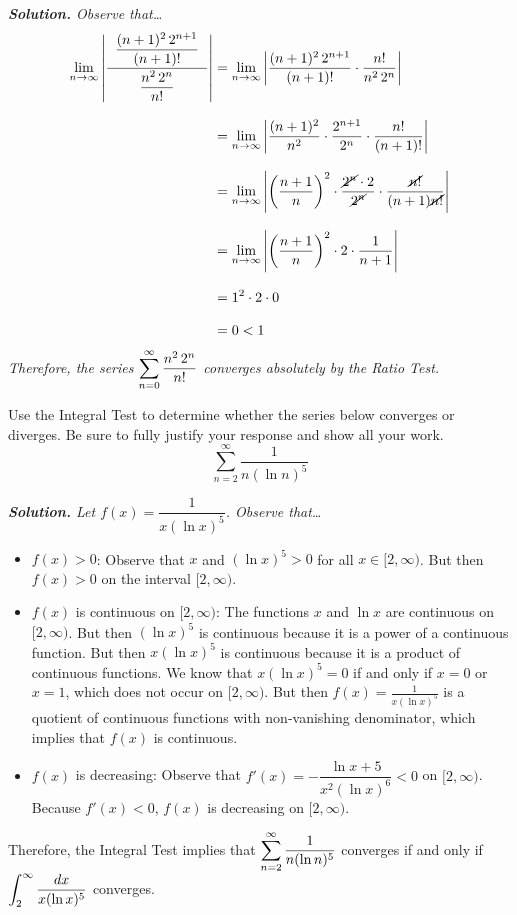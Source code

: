 \documentclass[12pt,letterpaper]{exam}
\begin{document}
\begin{questions}
{\itshape \textbf{Solution.} Observe that\dots
	\[
	\begin{aligned}
	\lim_{n \to \infty} \left| \dfrac{\;\;\dfrac{(n + 1)^2 \, 2^{n + 1}}{(n + 1)!}\;\;}{\dfrac{n^2 \, 2^n}{n!}} \right|&= \lim_{n \to \infty} \left| \dfrac{(n + 1)^2 \, 2^{n + 1}}{(n + 1)!} \cdot \dfrac{n!}{n^2 \,2^n} \right| \\[0.3cm]
	&= \lim_{n \to \infty} \left| \dfrac{(n + 1)^2}{n^2} \cdot \dfrac{2^{n + 1}}{2^n} \cdot \dfrac{n!}{(n + 1)!} \right| \\[0.3cm]
	&= \lim_{n \to \infty} \left| \left( \dfrac{n + 1}{n} \right)^2 \cdot \dfrac{\cancel{2^n} \cdot 2}{\cancel{2^n}} \cdot \dfrac{\cancel{n!}}{(n + 1) \cancel{n!}} \right| \\[0.3cm]
	&= \lim_{n \to \infty} \left| \left( \dfrac{n + 1}{n} \right)^2 \cdot 2 \cdot \dfrac{1}{n + 1} \right| \\[0.3cm]
	&= 1^2 \cdot 2 \cdot 0 \\[0.3cm]
	&= 0 < 1
	\end{aligned}
	\]
Therefore, the series $\displaystyle\sum_{n=0}^\infty \dfrac{n^2 \, 2^n}{n!}$ converges absolutely by the Ratio Test.}



\newpage
\question[15] Use the Integral Test to determine whether the series below converges or diverges. Be sure to fully justify your response and show all your work. 
	\[
	\sum_{n=2}^\infty \dfrac{1}{n (\ln n)^5}
	\] \pspace

{\itshape \textbf{Solution.} Let $f(x)= \dfrac{1}{x (\ln x)^5}$. Observe that\dots
	\begin{itemize}
	\item $f(x) > 0$: Observe that $x$ and $(\ln x)^5 > 0$ for all $x \in [2, \infty)$. But then $f(x) > 0$ on the interval $[2, \infty)$.
	\item $f(x)$ is continuous on $[2, \infty)$: The functions $x$ and $\ln x$ are continuous on $[2, \infty)$. But then $(\ln x)^5$ is continuous because it is a power of a continuous function. But then $x (\ln x)^5$ is continuous because it is a product of continuous functions. We know that $x (\ln x)^5= 0$ if and only if $x= 0$ or $x= 1$, which does not occur on $[2, \infty)$. But then $f(x)= \frac{1}{x (\ln x)^5}$ is a quotient of continuous functions with non-vanishing denominator, which implies that $f(x)$ is continuous.
	\item $f(x)$ is decreasing: Observe that $f'(x)= - \dfrac{\ln x + 5}{x^2 (\ln x)^6} < 0$ on $[2, \infty)$. Because $f'(x) < 0$, $f(x)$ is decreasing on $[2, \infty)$. 
	\end{itemize}
Therefore, the Integral Test implies that $\displaystyle\sum_{n=2}^\infty \dfrac{1}{n (\ln n)^5}$ converges if and only if $\displaystyle\int_2^\infty \dfrac{dx}{x (\ln x)^5}$ converges. \pspace

}
\end{questions}
\end{document}
